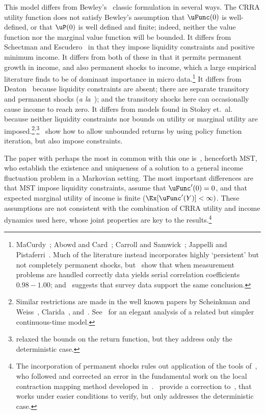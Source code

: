 \documentclass[BufferStockTheory]{subfiles}
\begin{document}
\hypertarget{DiffFromLit}{} This model differs from Bewley's~\citeyearpar{bewleyPIH} classic formulation in several ways. The CRRA utility function does not satisfy Bewley's assumption that $\uFunc(0)$ is well-defined, or that $\uP(0)$ is well defined and finite; indeed, neither the value function nor the marginal value function will be bounded.  It differs from Schectman and Escudero~\citeyearpar{seIncFluct} in that they impose liquidity constraints and positive minimum income.  It differs from both of these in that it permits permanent growth in income, and also permanent shocks to income, which a large empirical literature finds to be of dominant importance in micro data.\footnote{MaCurdy~\citeyearpar{macurdyTimeseries}; Abowd and Card~\citeyearpar{acCovariance}; Carroll and Samwick~\citeyearpar{csNature}; Jappelli and Pistaferri~\citeyearpar{jpCins}.  Much of the literature instead incorporates highly `persistent' but not completely permanent shocks, but~\cite{dhmImproving} show that when measurement problems are handled correctly data yields serial correlation coefficients $0.98-1.00$; and~\cite{dmHowMuch} suggests that survey data support the same conclusion.}  It differs from Deaton~\citeyearpar{deatonLiqConstr} because liquidity constraints are absent; there are separate transitory and permanent shocks (\textit{a la}~\cite{muthOptimal}); and the transitory shocks here can occasionally cause income to reach zero.%
It differs from models found in Stokey et.\ al.~\citeyearpar{slpMethods} because neither liquidity constraints nor bounds on utility or marginal utility are imposed.\footnote{Similar restrictions are made in the well known papers by Scheinkman and Weiss~\citeyearpar{scheinkman&weiss:borrowing}, Clarida~\citeyearpar{claridaErgodic}, and~\cite{cwcUnderUncert}.  See~\cite{tocheUrisk} for an elegant analysis of a related but simpler continuous-time model.}$^{,}$\footnote{\cite{asHomogeneous} relaxed the bounds on the return function, but they address only the deterministic case.}~\cite{lsIncFluct} show how to allow unbounded returns by using policy function iteration, but also impose constraints.

The paper with perhaps the most in common with this one is~\cite{mstIncFluct}, henceforth MST, who establish the existence and uniqueness of a solution to a general income fluctuation problem in a Markovian setting.  The most important differences are that MST impose liquidity constraints, assume that $\uFunc^{\prime}(0)=0$, and that expected marginal utility of income is finite ($\Ex[\uFunc^{\prime}(Y)]<\infty)$.  These assumptions are not consistent with the combination of CRRA utility and income dynamics used here, whose joint properties are key to the results.\footnote{The incorporation of permanent shocks rules out application of the tools of~\cite{mnUnique}, who followed and corrected an error in the fundamental work on the local contraction mapping method developed in~\cite{rrExistence}.\@~\cite{mvExistence} provide a correction to~\cite{rrExistence}, that works under easier conditions to verify, but only addresses the deterministic case.}
\end{document}
